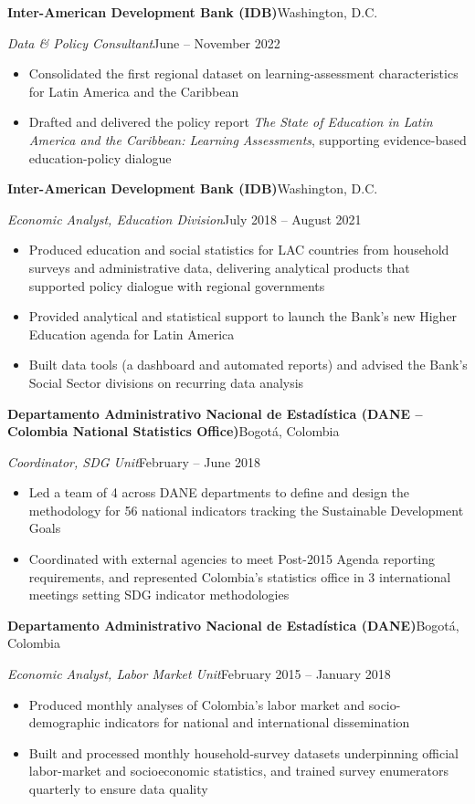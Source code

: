 \documentclass[10pt]{article}
\newcommand{\org}[2]{\noindent\textbf{#1}\hfill #2\par\vspace{0pt}}
\newcommand{\role}[2]{\noindent\textit{#1}\hfill #2\par\vspace{0pt}}
\newenvironment{cvitems}{%
  \begin{itemize}[
    leftmargin=1.2em,
    itemsep=0pt,
    parsep=0pt,
    topsep=1pt,
    label={$\bullet$}]%
}{\end{itemize}}
\newcommand{\entrygap}{\vspace{6pt}}
\begin{document}
\entrygap
\org{Inter-American Development Bank (IDB)}{Washington, D.C.}
\role{Data \& Policy Consultant}{June -- November 2022}
\vspace{-1pt}
\begin{cvitems}
  \item Consolidated the first regional dataset on learning-assessment characteristics for Latin America and the Caribbean
  \item Drafted and delivered the policy report \textit{The State of Education in Latin America and the Caribbean: Learning Assessments}, supporting evidence-based education-policy dialogue
\end{cvitems}

\entrygap
\org{Inter-American Development Bank (IDB)}{Washington, D.C.}
\role{Economic Analyst, Education Division}{July 2018 -- August 2021}
\vspace{-1pt}
\begin{cvitems}
  \item Produced education and social statistics for LAC countries from household surveys and administrative data, delivering analytical products that supported policy dialogue with regional governments
  \item Provided analytical and statistical support to launch the Bank's new Higher Education agenda for Latin America
  \item Built data tools (a dashboard and automated reports) and advised the Bank's Social Sector divisions on recurring data analysis
\end{cvitems}

\entrygap
\org{Departamento Administrativo Nacional de Estad\'istica (DANE -- Colombia National Statistics Office)}{Bogot\'a, Colombia}
\role{Coordinator, SDG Unit}{February -- June 2018}
\vspace{-1pt}
\begin{cvitems}
  \item Led a team of 4 across DANE departments to define and design the methodology for 56 national indicators tracking the Sustainable Development Goals
  \item Coordinated with external agencies to meet Post-2015 Agenda reporting requirements, and represented Colombia's statistics office in 3 international meetings setting SDG indicator methodologies
\end{cvitems}

\entrygap
\org{Departamento Administrativo Nacional de Estad\'istica (DANE)}{Bogot\'a, Colombia}
\role{Economic Analyst, Labor Market Unit}{February 2015 -- January 2018}
\vspace{-1pt}
\begin{cvitems}
  \item Produced monthly analyses of Colombia's labor market and socio-demographic indicators for national and international dissemination
  \item Built and processed monthly household-survey datasets underpinning official labor-market and socioeconomic statistics, and trained survey enumerators quarterly to ensure data quality
\end{cvitems}
\end{document}
